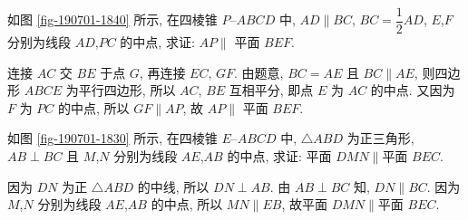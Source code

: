 \begin{example}
    如图 \ref{fig-190701-1840} 所示, 在四棱锥 $P\text{--}ABCD$ 中, $AD\parallel BC$, $BC=\dfrac12 AD$, $E$,$F$ 分别为线段 $AD$,$PC$ 的中点, 求证: $AP\parallel$ 平面 $BEF$.
\end{example}
\beginsolution
    连接 $AC$ 交 $BE$ 于点 $G$, 再连接 $EC$, $GF$. 
    由题意, $BC=AE$ 且 $BC\parallel AE$, 则四边形 $ABCE$ 为平行四边形, 所以 $AC$, $BE$ 互相平分, 即点 $E$ 为 $AC$ 的中点. 又因为 $F$ 为 $PC$ 的中点, 所以 $GF\parallel AP$, 故 $AP\parallel$ 平面 $BEF$.
\endsolution
       
\lianxi
\begin{exercise}[s]
    如图 \ref{fig-190701-1830} 所示, 在四棱锥 $E\text{--}ABCD$ 中, $\triangle ABD$ 为正三角形, $AB\perp BC$ 且 $M$,$N$ 分别为线段 $AE$,$AB$ 的中点, 求证: 平面 $DMN\parallel$平面 $BEC$.
\end{exercise}
\beginsolution
    因为 $DN$ 为正 $\triangle ABD$ 的中线, 所以 $DN\perp AB$. 由 $AB\perp BC$ 知, $DN\parallel BC$. 因为 $M$,$N$ 分别为线段 $AE$,$AB$ 的中点, 所以 $MN\parallel EB$, 故平面 $DMN\parallel$平面 $BEC$.
\endsolution

